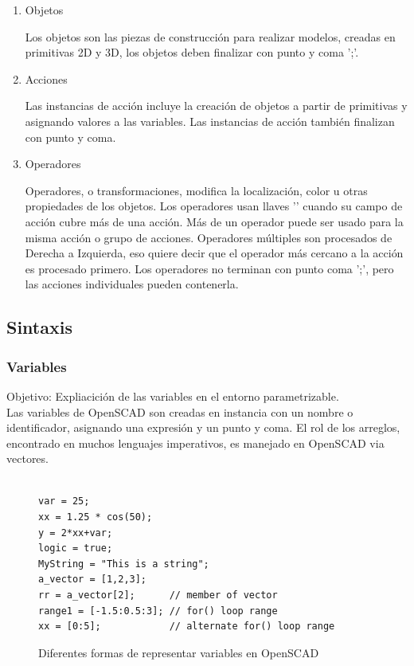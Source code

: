 \documentclass{article}
\begin{document}
    \begin{enumerate}
    
    \item Objetos

Los objetos son las piezas de construcción para realizar modelos, creadas en primitivas 2D y 3D, los objetos deben finalizar con punto y coma ';'.\citep{WikiOpensCADLanguage}

    \item Acciones
    
    Las instancias de acción incluye la creación de objetos a partir de primitivas y asignando valores a las variables. Las instancias de acción también finalizan con punto y coma.\citep{WikiOpensCADLanguage}
    
    \item Operadores
    
    Operadores, o transformaciones, modifica la localización, color u otras propiedades de los objetos. Los operadores usan llaves '{}' cuando su campo de acción cubre más de una acción. Más de un operador puede ser usado para la misma acción o grupo de acciones. Operadores múltiples son procesados de Derecha a Izquierda, eso quiere decir que el operador más cercano a la acción es procesado primero. Los operadores no terminan con punto  coma ';', pero las acciones individuales pueden contenerla.\citep{WikiOpensCADLanguage}
    
    \end{enumerate}
    
 

\subsection{Sintaxis}

\subsubsection{Variables}

Objetivo: Expliacición de las variables en el entorno parametrizable.\citep{OpenSCS}\\

Las variables de OpenSCAD son creadas en instancia con un nombre o identificador, asignando una expresión y un punto y coma. El rol de los arreglos, encontrado en muchos lenguajes imperativos, es manejado en OpenSCAD via vectores.\citep{WikiOpensCADLanguage}\\

\begin{figure}[h!]
\begin{verbatim}

var = 25;
xx = 1.25 * cos(50);
y = 2*xx+var;
logic = true;
MyString = "This is a string";
a_vector = [1,2,3];
rr = a_vector[2];      // member of vector
range1 = [-1.5:0.5:3]; // for() loop range
xx = [0:5];            // alternate for() loop range

\end{verbatim}
\caption{Diferentes formas de representar variables en OpenSCAD}
\end{figure}
\end{document}
